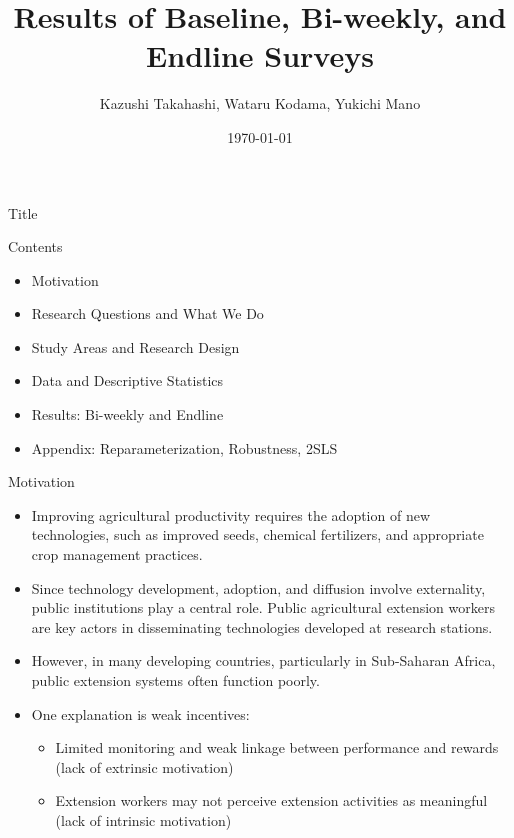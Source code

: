 \documentclass[aspectratio=169]{beamer}
\title[Short Title]{Results of Baseline, Bi-weekly, and Endline Surveys}
\author[Takahashi et al.]{Kazushi Takahashi, Wataru Kodama, Yukichi Mano}
\date{\today}
\begin{document}
	
	\begin{frame}{Title}
		\titlepage
	\end{frame}
	
	\begin{frame}{Contents} %
		\begin{itemize}
			\item Motivation %
			\item Research Questions and What We Do
			\item Study Areas and Research Design
			\item Data and Descriptive Statistics
			\item Results: Bi-weekly and Endline
			\item Appendix: Reparameterization, Robustness, 2SLS
		\end{itemize}
	\end{frame}

\begin{frame}{Motivation}
	
	\begin{itemize}
		\item Improving agricultural productivity requires the adoption of new technologies,
		such as improved seeds, chemical fertilizers, and appropriate crop management practices.
		
		\vspace{0.3cm}
		
		\item Since technology development, adoption, and diffusion involve externality, public institutions play a central role.
		Public agricultural extension workers are key actors in disseminating technologies developed at research stations.
		
		\vspace{0.3cm}
		
		\item However, in many developing countries, particularly in Sub-Saharan Africa, public extension systems often function poorly.
		
		\vspace{0.3cm}
		
		\item One explanation is weak incentives:
		\begin{itemize}
			\item Limited monitoring and weak linkage between performance and rewards (lack of extrinsic motivation)
			\item Extension workers may not perceive extension activities as meaningful (lack of intrinsic motivation)
		\end{itemize}
		
		\vspace{0.3cm}
		
		
	\end{itemize}
	
\end{frame}
\end{document}
